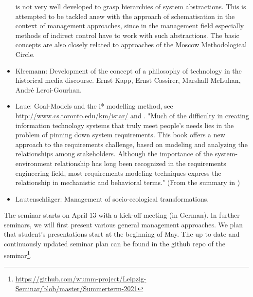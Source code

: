 \documentclass[11pt,a4paper]{article}
\begin{document}
\begin{itemize}
  is not very well developed to grasp hierarchies of system abstractions. This
  is attempted to be tackled anew with the approach of schematisation in the
  context of management approaches, since in the management field especially
  methods of indirect control have to work with such abstractions. The basic
  concepts are also closely related to approaches of the Moscow Methodological
  Circle.
\item Kleemann: Development of the concept of a philosophy of technology in
  the historical media discourse.  Ernst Kapp, Ernst Cassirer, Marshall
  McLuhan, André Leroi-Gourhan.\enlargethispage{1em}
\item Laue: Goal-Models and the i* modelling method, see
  \url{http://www.cs.toronto.edu/km/istar/} and \cite{Yu2010}.  "Much of the
  difficulty in creating information technology systems that truly meet
  people's needs lies in the problem of pinning down system requirements. This
  book offers a new approach to the requirements challenge, based on modeling
  and analyzing the relationships among stakeholders. Although the importance
  of the system-environment relationship has long been recognized in the
  requirements engineering field, most requirements modeling techniques
  express the relationship in mechanistic and behavioral terms." (From the
  summary in \cite{Yu2010})
\item Lautenschläger: Management of socio-ecological transformations. 
\end{itemize}

The seminar starts on April 13 with a kick-off meeting (in German).  In
further seminars, we will first present various general management approaches.
We plan that student's presentations start at the beginning of May.  The up to
date and continuously updated seminar plan can be found in the github repo of
the
seminar\footnote{\url{https://github.com/wumm-project/Leipzig-Seminar/blob/master/Summerterm-2021}}.
\end{document}
